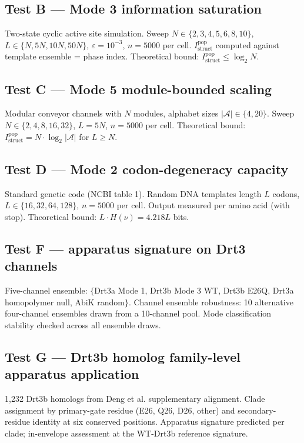 \documentclass[aps,prx,reprint,amsmath,amssymb,floatfix,superscriptaddress,nofootinbib]{revtex4-2}
\theoremstyle{plain-thm}
\theoremstyle{definition-thm}
\newcommand{\Istructpop}{I_{\mathrm{struct}}^{\mathrm{pop}}}
\begin{document}
\subsection{Test B --- Mode 3 information saturation}

Two-state cyclic active site simulation. Sweep $N \in \{2, 3, 4, 5, 6, 8, 10\}$, $L \in \{N, 5N, 10N, 50N\}$, $\varepsilon = 10^{-3}$, $n = 5000$ per cell. $\Istructpop$ computed against template ensemble = phase index. Theoretical bound: $\Istructpop \le \log_2 N$.

\subsection{Test C --- Mode 5 module-bounded scaling}

Modular conveyor channels with $N$ modules, alphabet sizes $|\mathcal{A}| \in \{4, 20\}$. Sweep $N \in \{2, 4, 8, 16, 32\}$, $L = 5N$, $n = 5000$ per cell. Theoretical bound: $\Istructpop = N \cdot \log_2 |\mathcal{A}|$ for $L \ge N$.

\subsection{Test D --- Mode 2 codon-degeneracy capacity}

Standard genetic code (NCBI table 1). Random DNA templates length $L$ codons, $L \in \{16, 32, 64, 128\}$, $n = 5000$ per cell. Output measured per amino acid (with stop). Theoretical bound: $L \cdot H(\nu) = 4.218L$ bits.

\subsection{Test F --- apparatus signature on Drt3 channels}

Five-channel ensemble: $\{$Drt3a Mode 1, Drt3b Mode 3 WT, Drt3b E26Q, Drt3a homopolymer null, AbiK random$\}$. Channel ensemble robustness: 10 alternative four-channel ensembles drawn from a 10-channel pool. Mode classification stability checked across all ensemble draws.

\subsection{Test G --- Drt3b homolog family-level apparatus application}

1{,}232 Drt3b homologs from Deng et al. supplementary alignment. Clade assignment by primary-gate residue (E26, Q26, D26, other) and secondary-residue identity at six conserved positions. Apparatus signature predicted per clade; in-envelope assessment at the WT-Drt3b reference signature.
\end{document}
